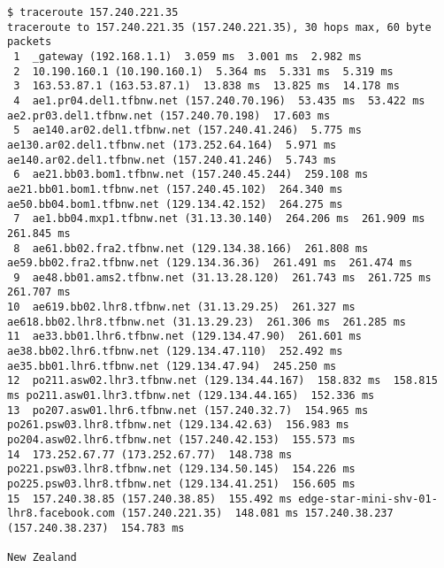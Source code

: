 \documentclass[a4paper]{article}
\begin{document}
\begin{lstlisting}
$ traceroute 157.240.221.35
traceroute to 157.240.221.35 (157.240.221.35), 30 hops max, 60 byte packets
 1  _gateway (192.168.1.1)  3.059 ms  3.001 ms  2.982 ms
 2  10.190.160.1 (10.190.160.1)  5.364 ms  5.331 ms  5.319 ms
 3  163.53.87.1 (163.53.87.1)  13.838 ms  13.825 ms  14.178 ms
 4  ae1.pr04.del1.tfbnw.net (157.240.70.196)  53.435 ms  53.422 ms ae2.pr03.del1.tfbnw.net (157.240.70.198)  17.603 ms
 5  ae140.ar02.del1.tfbnw.net (157.240.41.246)  5.775 ms ae130.ar02.del1.tfbnw.net (173.252.64.164)  5.971 ms ae140.ar02.del1.tfbnw.net (157.240.41.246)  5.743 ms
 6  ae21.bb03.bom1.tfbnw.net (157.240.45.244)  259.108 ms ae21.bb01.bom1.tfbnw.net (157.240.45.102)  264.340 ms ae50.bb04.bom1.tfbnw.net (129.134.42.152)  264.275 ms
 7  ae1.bb04.mxp1.tfbnw.net (31.13.30.140)  264.206 ms  261.909 ms  261.845 ms
 8  ae61.bb02.fra2.tfbnw.net (129.134.38.166)  261.808 ms ae59.bb02.fra2.tfbnw.net (129.134.36.36)  261.491 ms  261.474 ms
 9  ae48.bb01.ams2.tfbnw.net (31.13.28.120)  261.743 ms  261.725 ms  261.707 ms
10  ae619.bb02.lhr8.tfbnw.net (31.13.29.25)  261.327 ms ae618.bb02.lhr8.tfbnw.net (31.13.29.23)  261.306 ms  261.285 ms
11  ae33.bb01.lhr6.tfbnw.net (129.134.47.90)  261.601 ms ae38.bb02.lhr6.tfbnw.net (129.134.47.110)  252.492 ms ae35.bb01.lhr6.tfbnw.net (129.134.47.94)  245.250 ms
12  po211.asw02.lhr3.tfbnw.net (129.134.44.167)  158.832 ms  158.815 ms po211.asw01.lhr3.tfbnw.net (129.134.44.165)  152.336 ms
13  po207.asw01.lhr6.tfbnw.net (157.240.32.7)  154.965 ms po261.psw03.lhr8.tfbnw.net (129.134.42.63)  156.983 ms po204.asw02.lhr6.tfbnw.net (157.240.42.153)  155.573 ms
14  173.252.67.77 (173.252.67.77)  148.738 ms po221.psw03.lhr8.tfbnw.net (129.134.50.145)  154.226 ms po225.psw03.lhr8.tfbnw.net (129.134.41.251)  156.605 ms
15  157.240.38.85 (157.240.38.85)  155.492 ms edge-star-mini-shv-01-lhr8.facebook.com (157.240.221.35)  148.081 ms 157.240.38.237 (157.240.38.237)  154.783 ms

New Zealand


\end{lstlisting}
\end{document}
